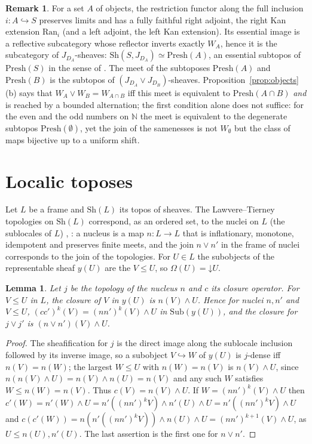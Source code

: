 \documentclass[11pt]{amsart}
\newtheorem{lem}[thm]{Lemma}
\theoremstyle{definition}
\newtheorem{rem}[thm]{Remark}
\newcommand{\Presh}{\mathrm{Presh}}
\newcommand{\Sh}{\mathrm{Sh}}
\newcommand{\Sub}{\mathrm{Sub}}
\begin{document}
\begin{rem}
For a set $A$ of objects, the restriction functor along the full inclusion
$i\colon A\hookrightarrow S$ preserves limits and has a fully faithful right
adjoint, the right Kan extension $\mathrm{Ran}_i$ (and a left adjoint, the
left Kan extension). Its essential image is a reflective subcategory whose
reflector inverts exactly $W_A$, hence it is the subcategory of
$J_{D_A}$-sheaves: $\Sh(S,J_{D_A})\simeq\Presh(A)$, an essential
subtopos of $\Presh(S)$ in the sense of \cite{KL89}. The meet of the
subtoposes $\Presh(A)$ and $\Presh(B)$ is the subtopos of
$(J_{D_A}\vee J_{D_B})$-sheaves. Proposition~\ref{prop:objects}(b) says that
$W_A\vee W_B=W_{A\cap B}$ iff this meet is equivalent to $\Presh(A\cap B)$
\emph{and} is reached by a bounded alternation; the first condition alone
does not suffice: for the even and the odd numbers on $\mathbb N$ the meet is
equivalent to the degenerate subtopos $\Presh(\emptyset)$, yet the join of
the samenesses is not $W_\emptyset$ but the class of maps bijective up to a
uniform shift.
\end{rem}

\section{Localic toposes}\label{sec:localic}

Let $L$ be a frame and $\Sh(L)$ its topos of sheaves. The Lawvere--Tierney
topologies on $\Sh(L)$ correspond, as an ordered set, to the nuclei on $L$
(the sublocales of $L$) \cite[II.2]{StoneSpaces}, \cite[A4.5]{Elephant}: a
nucleus is a map $n\colon L\to L$ that is inflationary, monotone, idempotent
and preserves finite meets, and the join $n\vee n'$ in the frame of nuclei
corresponds to the join of the topologies. For $U\in L$ the subobjects of
the representable sheaf $y(U)$ are the $V\le U$, so $\Omega(U)=\mathord\downarrow U$.

\begin{lem}\label{lem:localic}
Let $j$ be the topology of the nucleus $n$ and $c$ its closure operator.
For $V\le U$ in $L$, the closure of $V$ in $y(U)$ is $n(V)\wedge U$. Hence
for nuclei $n,n'$ and $V\le U$, $(cc')^k(V)=(nn')^k(V)\wedge U$ in
$\Sub(y(U))$, and the closure for $j\vee j'$ is $(n\vee n')(V)\wedge U$.
\end{lem}
\begin{proof}
The sheafification for $j$ is the direct image along the sublocale
inclusion followed by its inverse image, so a subobject $V\hookrightarrow W$
of $y(U)$ is $j$-dense iff $n(V)=n(W)$; the largest $W\le U$ with $n(W)=n(V)$
is $n(V)\wedge U$, since $n(n(V)\wedge U)=n(V)\wedge n(U)=n(V)$ and any such $W$
satisfies $W\le n(W)=n(V)$. Thus $c(V)=n(V)\wedge U$. If $W=(nn')^k(V)\wedge U$
then $c'(W)=n'(W)\wedge U=n'((nn')^kV)\wedge n'(U)\wedge U=n'((nn')^kV)\wedge U$
and $c(c'(W))=n(n'((nn')^kV))\wedge n(U)\wedge U=(nn')^{k+1}(V)\wedge U$, as
$U\le n(U),n'(U)$. The last assertion is the first one for $n\vee n'$.
\end{proof}
\end{document}
